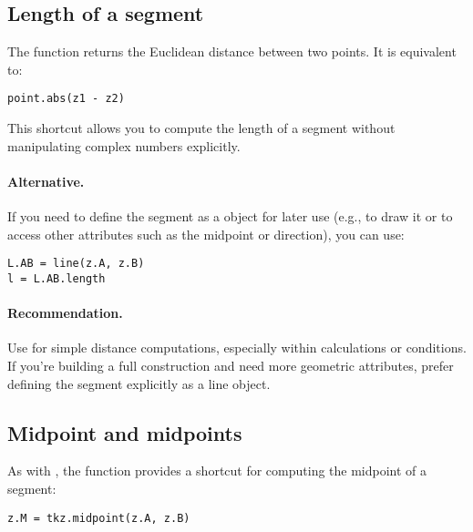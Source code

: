 \subsection{Length of a segment} %
\label{sub:length_of_a_segment}

The function  returns the Euclidean distance between two points. It is equivalent to:

\begin{mybox}
\begin{verbatim}
point.abs(z1 - z2)
\end{verbatim}
\end{mybox}

This shortcut allows you to compute the length of a segment without manipulating complex numbers explicitly.

\paragraph{Alternative.}
If you need to define the segment as a  object for later use (e.g., to draw it or to access other attributes such as the midpoint or direction), you can use:

\begin{mybox}
\begin{verbatim}
L.AB = line(z.A, z.B)
l = L.AB.length
\end{verbatim}
\end{mybox}

\paragraph{Recommendation.}
Use  for simple distance computations, especially within calculations or conditions. If you're building a full construction and need more geometric attributes, prefer defining the segment explicitly as a line object.



\subsection{Midpoint and midpoints} %
\label{sub:midpoint_and_midpoints}

As with , the function  provides a shortcut for computing the midpoint of a segment:

\begin{mybox}
\begin{verbatim}
z.M = tkz.midpoint(z.A, z.B)
\end{verbatim}
\end{mybox}


